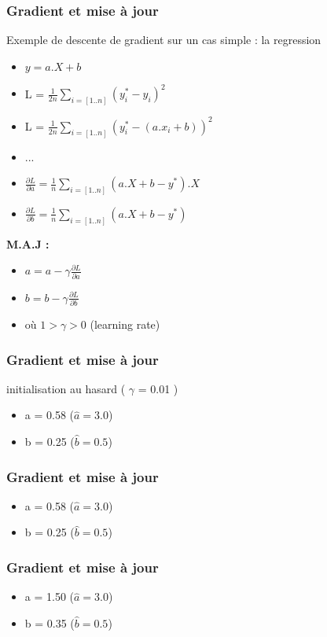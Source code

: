 \documentclass{formation}
\begin{document}
\begin{frame}
  \frametitle{Gradient et mise à jour}
  Exemple de descente de gradient sur un cas simple : la regression
  \begin{itemize}
  \item $y = a.X+b$
  \item L = $\frac{1}{2n}\sum_{i=[1..n]}( y_i^* - y_i )^2$
  \item L = $\frac{1}{2n}\sum_{i=[1..n]}( y_i^* - (a.x_i+b) )^2$
  \item ...
  \item $\frac{\partial{L}}{\partial{a}} = \frac{1}{n}\sum_{i=[1..n]}(a.X+b - y^*).X$
  \item $\frac{\partial{L}}{\partial{b}} = \frac{1}{n}\sum_{i=[1..n]}(a.X+b - y^*)$
  \end{itemize}
  \textbf{M.A.J :}
  \begin{itemize}
  \item $a = a - \gamma\frac{\partial{L}}{\partial{a}}$
  \item $b = b - \gamma\frac{\partial{L}}{\partial{b}}$
  \item où $1 > \gamma > 0$ (learning rate)
  \end{itemize}
\end{frame}

\begin{frame}
  \frametitle{Gradient et mise à jour}
  initialisation au hasard ( $\gamma$ = 0.01 )
  \begin{itemize}
  \item a = 0.58 ($\hat{a} = 3.0$)
  \item b = 0.25 ($\hat{b} = 0.5$)
  \end{itemize}
\end{frame}

\begin{frame}
  \frametitle{Gradient et mise à jour}
  \begin{itemize}
  \item a = 0.58 ($\hat{a} = 3.0$)
  \item b = 0.25 ($\hat{b} = 0.5$)
  \end{itemize}
\end{frame}

\begin{frame}
  \frametitle{Gradient et mise à jour}
  \begin{itemize}
  \item a = 1.50 ($\hat{a} = 3.0$)
  \item b = 0.35 ($\hat{b} = 0.5$)
  \end{itemize}
\end{frame}
\end{document}
